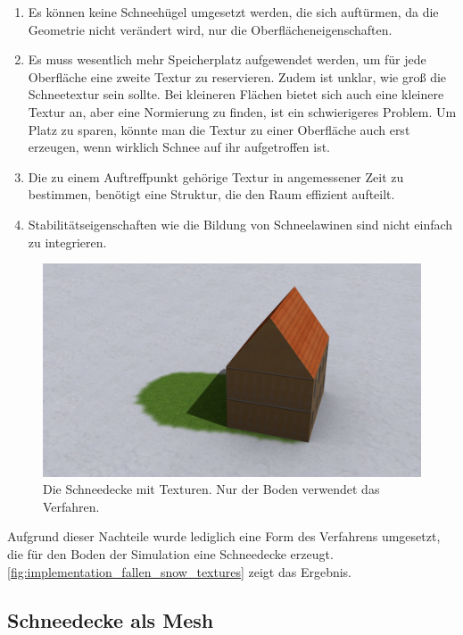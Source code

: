 \begin{enumerate}
\item Es können keine Schneehügel umgesetzt werden, die sich
auftürmen, da die Geometrie nicht verändert wird, nur die
Oberflächeneigenschaften.
\item Es muss wesentlich mehr Speicherplatz aufgewendet werden, um für
jede Oberfläche eine zweite Textur zu reservieren. Zudem ist unklar,
wie groß die Schneetextur sein sollte. Bei kleineren
Flächen bietet sich auch eine kleinere Textur an, aber eine Normierung
zu finden, ist ein schwierigeres Problem. Um Platz zu sparen, könnte
man die Textur zu einer Oberfläche auch erst erzeugen, wenn wirklich
Schnee auf ihr aufgetroffen ist.
\item Die zu einem Auftreffpunkt gehörige Textur in angemessener Zeit
zu bestimmen, benötigt eine Struktur, die den Raum effizient aufteilt.
\item Stabilitätseigenschaften wie die Bildung von Schneelawinen sind
nicht einfach zu integrieren.
\end{enumerate}

\begin{figure}[h]
\centering
\includegraphics[width=14cm]{images/snow_cover_textures}
\caption{Die Schneedecke mit Texturen. Nur der Boden verwendet das Verfahren.}
\label{fig:implementation_fallen_snow_textures}
\end{figure}

Aufgrund dieser Nachteile wurde lediglich eine Form des Verfahrens
umgesetzt, die für den Boden der Simulation eine Schneedecke
erzeugt. \autoref{fig:implementation_fallen_snow_textures} zeigt das
Ergebnis.

\subsection{Schneedecke als Mesh}


